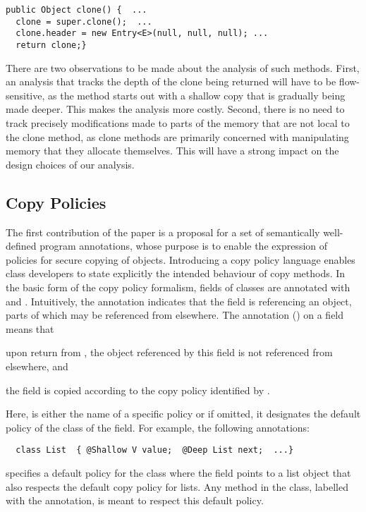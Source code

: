 \documentclass{LMCS}
\newcommand{\ttt}[1]{}
\begin{document}
\begin{lstlisting}
public Object clone() {  ...
  clone = super.clone();  ...
  clone.header = new Entry<E>(null, null, null); ...
  return clone;}
\end{lstlisting}

\noindent
There are two observations to be made about the analysis of such methods.
First, an analysis that tracks the depth of the clone being returned will have
to be flow-sensitive, as the method starts out with a shallow copy that is
gradually being made deeper. This makes the analysis more costly. Second,
there is no need to track precisely modifications made to parts of the memory
that are not local to the clone method, as clone methods are primarily
concerned with manipulating memory that they allocate themselves. This
will have a strong impact on the design choices of our analysis.



\subsection{Copy Policies}
\label{sec:intro:pol}

The first contribution of the paper is a proposal for a set of semantically
well-defined program annotations, whose purpose is to enable the expression of
policies for secure copying of objects. Introducing a copy policy language
enables class developers to state explicitly the intended behaviour of copy
methods. 
In the basic form of the copy policy formalism, fields of classes are
annotated with \ttt{@Shallow} and \ttt{@Deep}. Intuitively, the annotation
\ttt{@Shallow} indicates that the field is referencing an object, parts of which
may be referenced from elsewhere. The annotation \ttt{@Deep}(\ttt{X}) on a
field \ttt{f} means
that 
\begin{inparaenum}
\item upon return from \ttt{clone()}, the object referenced by this field \ttt{f} is not referenced
  from elsewhere, and
\item the field \ttt{f} is copied according to the copy policy identified by \ttt{X}. 
\end{inparaenum} 
Here, \ttt{X} is either the name of a specific policy or if omitted,
it designates the default policy of the class of the field. 
For example, the following annotations:
\begin{lstlisting}
  class List  { @Shallow V value;  @Deep List next;  ...}
\end{lstlisting}
specifies a default policy for the class \ttt{List} where the \ttt{next} field
points to a list object that also respects the default copy policy for
lists. Any method in the \ttt{List} class, labelled with the \ttt{@Copy}
annotation, is meant to respect this default policy.
\end{document}
